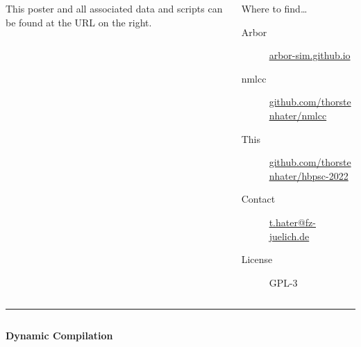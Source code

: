\documentclass{beamer}
\begin{document}
\begin{frame}[t, fragile]
\begin{columns}[onlytextwidth,T]
\begin{column}{0.76\textwidth}
      This poster and all associated data and scripts can be found at the URL on
      the right.
    \end{column}
    \begin{column}{0.22\textwidth}
      \vspace*{-1ex}
      \begin{block}{Where to find\dots}
        \begin{description}
          \item[Arbor] \href{https://arbor-sim.github.io}{arbor-sim.github.io}
          \item[nmlcc] \href{https://github.com/thorstenhater/nmlcc}{github.com/thorstenhater/nmlcc}
          \item[This] \href{https://github.com/thorstenhater/nmlcc}{github.com/thorstenhater/hbpsc-2022}
          \item[Contact] \href{mailto:t.hater@fz-juelich.de}{t.hater@fz-juelich.de}
          \item[License] GPL-3
        \end{description}
      \end{block}
    \end{column}
  \end{columns}
  \vspace*{1ex}
  \textcolor{arbgrey}{\rule{\textwidth}{0.5ex}}
  \vspace*{-1ex}
  \begin{columns}
    \begin{column}{0.55\textwidth}
      \textbf{Dynamic Compilation}


\end{column}
\end{columns}
\end{frame}
\end{document}

